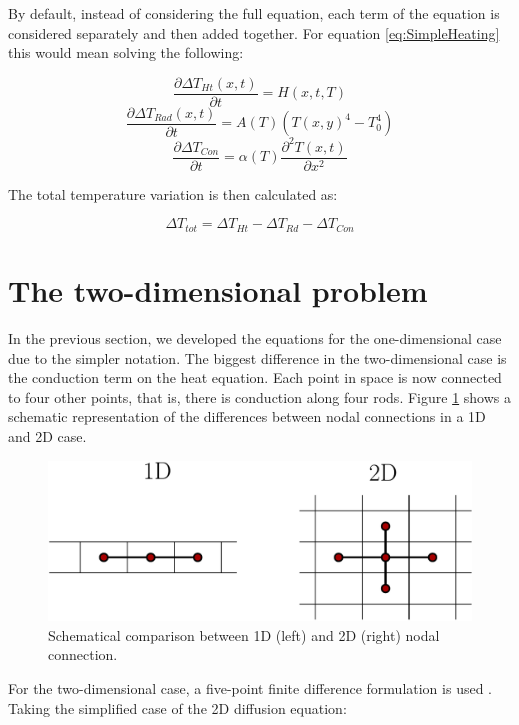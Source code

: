 By default, instead of considering the full equation, each term of the equation is considered separately and then added together. For equation \ref{eq:SimpleHeating} this would mean solving the following: 

\begin{equation}
    \frac{\partial \Delta T_{Ht} (x,t)}{\partial t} = H(x,t,T)
\end{equation}
\begin{equation}
    \frac{\partial \Delta T_{Rad} (x,t)}{\partial t} = A(T) \left(T(x,y)^4 - T_0^4\right)
\end{equation}
\begin{equation}
    \frac{\partial \Delta T_{Con}}{\partial t} = \alpha(T)\frac{\partial^2 T(x,t)}{\partial x^2}
\end{equation}

The total temperature variation is then calculated as: 

\begin{equation}
    \Delta T_{tot} = \Delta T_{Ht} - \Delta T_{Rd} - \Delta T_{Con}
\end{equation}


\section{The two-dimensional problem}

In the previous section, we developed the equations for the one-dimensional case due to the simpler notation. The biggest difference in the two-dimensional case is the conduction term on the heat equation. Each point in space is now connected to four other points, that is, there is conduction along four rods. Figure \ref{fig:1Dvs2D} shows a schematic representation of the differences between nodal connections in a 1D and 2D case.  

\begin{figure}[h]
    \centering
    \includegraphics[width=0.60\columnwidth]{1D_vs_2D_cond/1Dvs2F.pdf}
    \caption{Schematical comparison between 1D (left) and 2D (right) nodal connection.}
    \label{fig:1Dvs2D}
\end{figure}

For the two-dimensional case, a five-point finite difference formulation is used \parencite[][]{ref:FiniteDifference}. Taking the simplified case of the 2D diffusion equation: 

